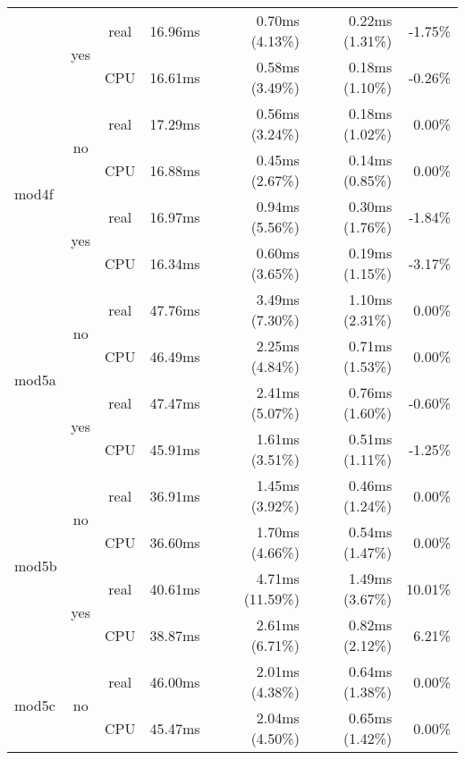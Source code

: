 \documentclass[en]{pracamgr}
\begin{document}
\begin{appendices}
\begin{small}
\begin{longtable}{|l|c|c|r|r|r|r|}
                          \cline{2-7}
                          & \multirow{2}{*}{yes} & real & 16.96ms & 0.70ms (4.13\%) & 0.22ms (1.31\%) & -1.75\% \\*
                          &                      & CPU  & 16.61ms & 0.58ms (3.49\%) & 0.18ms (1.10\%) & -0.26\% \\
\hline
\multirow{4}{*}{mod4f}    & \multirow{2}{*}{no}  & real & 17.29ms & 0.56ms (3.24\%) & 0.18ms (1.02\%) & 0.00\% \\*
                          &                      & CPU  & 16.88ms & 0.45ms (2.67\%) & 0.14ms (0.85\%) & 0.00\% \\*
                          \cline{2-7}
                          & \multirow{2}{*}{yes} & real & 16.97ms & 0.94ms (5.56\%) & 0.30ms (1.76\%) & -1.84\% \\*
                          &                      & CPU  & 16.34ms & 0.60ms (3.65\%) & 0.19ms (1.15\%) & -3.17\% \\
\hline
\multirow{4}{*}{mod5a}    & \multirow{2}{*}{no}  & real & 47.76ms & 3.49ms (7.30\%) & 1.10ms (2.31\%) & 0.00\% \\*
                          &                      & CPU  & 46.49ms & 2.25ms (4.84\%) & 0.71ms (1.53\%) & 0.00\% \\*
                          \cline{2-7}
                          & \multirow{2}{*}{yes} & real & 47.47ms & 2.41ms (5.07\%) & 0.76ms (1.60\%) & -0.60\% \\*
                          &                      & CPU  & 45.91ms & 1.61ms (3.51\%) & 0.51ms (1.11\%) & -1.25\% \\
\hline
\multirow{4}{*}{mod5b}    & \multirow{2}{*}{no}  & real & 36.91ms & 1.45ms (3.92\%) & 0.46ms (1.24\%) & 0.00\% \\*
                          &                      & CPU  & 36.60ms & 1.70ms (4.66\%) & 0.54ms (1.47\%) & 0.00\% \\*
                          \cline{2-7}
                          & \multirow{2}{*}{yes} & real & 40.61ms & 4.71ms (11.59\%) & 1.49ms (3.67\%) & 10.01\% \\*
                          &                      & CPU  & 38.87ms & 2.61ms (6.71\%) & 0.82ms (2.12\%) & 6.21\% \\
\hline
\multirow{4}{*}{mod5c}    & \multirow{2}{*}{no}  & real & 46.00ms & 2.01ms (4.38\%) & 0.64ms (1.38\%) & 0.00\% \\*
                          &                      & CPU  & 45.47ms & 2.04ms (4.50\%) & 0.65ms (1.42\%) & 0.00\% \\*

\end{longtable}
\end{small}
\end{appendices}
\end{document}
